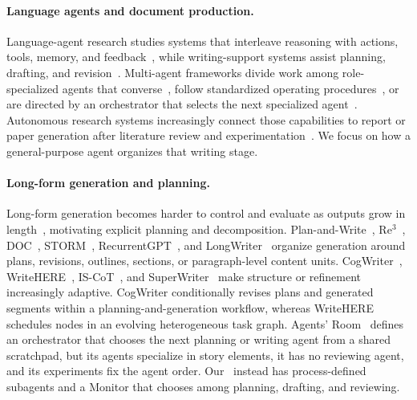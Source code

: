 \paragraph{Language agents and document production.}
Language-agent research studies systems that interleave reasoning with actions, tools, memory, and feedback~\citep{yao2023react,shinn2023reflexion,sumers2024cognitive}, while writing-support systems assist planning, drafting, and revision~\citep{gero2022design}.
Multi-agent frameworks divide work among role-specialized agents that converse~\citep{wu2024autogen}, follow standardized operating procedures~\citep{hong2024metagpt}, or are directed by an orchestrator that selects the next specialized agent~\citep{fourney2024magentic}.
Autonomous research systems increasingly connect those capabilities to report or paper generation after literature review and experimentation~\citep{schmidgall2025agentlab,lu2024aiscientist}.
We focus on how a general-purpose agent organizes that writing stage.

\paragraph{Long-form generation and planning.}
Long-form generation becomes harder to control and evaluate as outputs grow in length~\citep{tan2024proxyqa,wu2026superwriter}, motivating explicit planning and decomposition.
Plan-and-Write~\citep{yao2019plan}, Re$^3$~\citep{yang2022re3}, DOC~\citep{yang2023doc}, STORM~\citep{shao2024assisting}, RecurrentGPT~\citep{zhou2023recurrentgpt}, and LongWriter~\citep{bai2025longwriter} organize generation around plans, revisions, outlines, sections, or paragraph-level content units.
CogWriter~\citep{wan2025cognitive}, WriteHERE~\citep{xiong2025beyond}, IS-CoT~\citep{sun2026cot}, and SuperWriter~\citep{wu2026superwriter} make structure or refinement increasingly adaptive.
CogWriter conditionally revises plans and generated segments within a planning-and-generation workflow, whereas WriteHERE schedules nodes in an evolving heterogeneous task graph.
Agents' Room~\citep{huot2025agents} defines an orchestrator that chooses the next planning or writing agent from a shared scratchpad, but its agents specialize in story elements, it has no reviewing agent, and its experiments fix the agent order.
Our \condAgenticCogWriter\ instead has process-defined subagents and a Monitor that chooses among planning, drafting, and reviewing.


